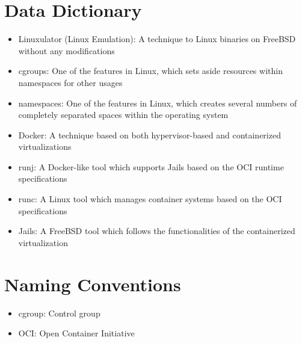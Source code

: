 \documentclass[12pt, dvipsnames, a4paper]{article}
\begin{document}
\section{Data Dictionary}
\begin{itemize}
	\item {Linuxulator (Linux Emulation): A technique to Linux binaries on FreeBSD without any modifications \cite{linuxulator}}
	\item {cgroups: One of the features in Linux, which sets aside resources within namespaces for other usages}
	\item {namespaces: One of the features in Linux, which creates several numbers of completely separated spaces within the operating system}
	\item {Docker: A technique based on both hypervisor-based and containerized virtualizations}
	\item {runj: A Docker-like tool which supports Jails based on the OCI runtime specifications}
	\item {runc: A Linux tool which manages container systems based on the OCI specifications}
	\item {Jails: A FreeBSD tool which follows the functionalities of the containerized virtualization}
\end{itemize}

\section{Naming Conventions}
\begin{itemize}
	\item {cgroup: Control group}
	\item {OCI: Open Container Initiative}
\end{itemize}
\clearpage
\end{document}
